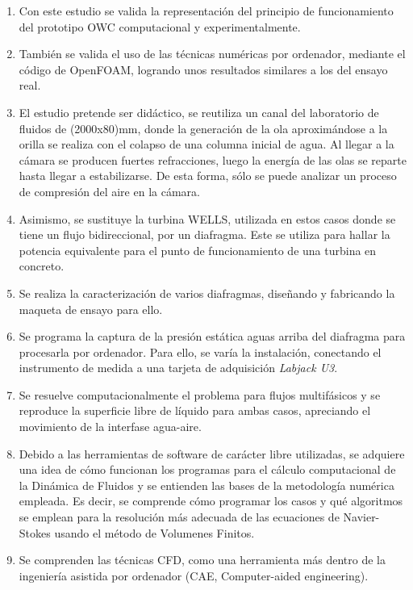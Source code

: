 \begin{enumerate}
\def\labelenumi{\arabic{enumi}.}
\item
  Con este estudio se valida la representación del principio de
  funcionamiento del prototipo OWC computacional y experimentalmente.
\item
  También se valida el uso de las técnicas numéricas por ordenador,
  mediante el código de OpenFOAM, logrando unos resultados similares a
  los del ensayo real.
\item
  El estudio pretende ser didáctico, se reutiliza un canal del
  laboratorio de fluidos de (2000x80)mm, donde la generación de la ola
  aproximándose a la orilla se realiza con el colapso de una columna
  inicial de agua. Al llegar a la cámara se producen fuertes
  refracciones, luego la energía de las olas se reparte hasta llegar a
  estabilizarse. De esta forma, sólo se puede analizar un proceso de
  compresión del aire en la cámara.
\item
  Asimismo, se sustituye la turbina WELLS, utilizada en estos casos
  donde se tiene un flujo bidireccional, por un diafragma. Este se
  utiliza para hallar la potencia equivalente para el punto de
  funcionamiento de una turbina en concreto.
\item
  Se realiza la caracterización de varios diafragmas, diseñando y
  fabricando la maqueta de ensayo para ello.
\item
  Se programa la captura de la presión estática aguas arriba del
  diafragma para procesarla por ordenador. Para ello, se varía la
  instalación, conectando el instrumento de medida a una tarjeta de
  adquisición \emph{Labjack U3}.
\item
  Se resuelve computacionalmente el problema para flujos multifásicos y
  se reproduce la superficie libre de líquido para ambas casos,
  apreciando el movimiento de la interfase agua-aire.\\
\item
  Debido a las herramientas de software de carácter libre utilizadas, se
  adquiere una idea de cómo funcionan los programas para el cálculo
  computacional de la Dinámica de Fluidos y se entienden las bases de la
  metodología numérica empleada. Es decir, se comprende cómo programar
  los casos y qué algoritmos se emplean para la resolución más adecuada
  de las ecuaciones de Navier-Stokes usando el método de Volumenes
  Finitos.
\item
  Se comprenden las técnicas CFD, como una herramienta más dentro de la
  ingeniería asistida por ordenador (CAE, Computer-aided engineering).

\end{enumerate}
